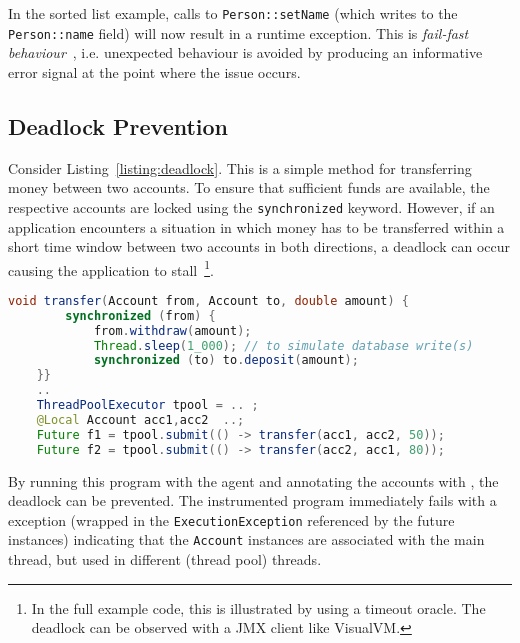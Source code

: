 In the sorted list example, calls to \texttt{Person::setName} (which writes to the \texttt{Person::name} field) will now result in a runtime exception. 
This is \textit{fail-fast behaviour}~\cite{shore2004fail}, i.e. unexpected behaviour is avoided by producing an informative error signal at the point where the issue occurs. 

\subsection{Deadlock Prevention}	

Consider Listing~\ref{listing:deadlock}.  This is a simple method for transferring money between two accounts. To ensure that sufficient funds are available, the respective accounts are locked using the \texttt{synchronized} keyword.  However, if an application encounters a situation in which money has to be transferred within a short time window between two accounts in both directions, a deadlock can occur causing the application to stall~\footnote{In the full example code, this is illustrated by using a timeout oracle. The deadlock can be observed with a JMX client like VisualVM.}.


\begin{lstlisting}[language=Java, caption=Money transfer implementation prone to deadlock, label=listing:deadlock]
	void transfer(Account from, Account to, double amount) {
		synchronized (from) {
			from.withdraw(amount);
			Thread.sleep(1_000); // to simulate database write(s)
			synchronized (to) to.deposit(amount);
	}}
	.. 
	ThreadPoolExecutor tpool = .. ;
	@Local Account acc1,acc2  ..;
	Future f1 = tpool.submit(() -> transfer(acc1, acc2, 50)); 
	Future f2 = tpool.submit(() -> transfer(acc2, acc1, 80));
\end{lstlisting}

By  running this program with the \jdala agent and annotating the accounts with \Local , the deadlock can be prevented. The instrumented program immediately fails with a \jdala exception (wrapped in the \texttt{ExecutionException} referenced by the future instances) indicating that the \texttt{Account} instances are associated with the main thread, but used in different (thread pool) threads. 
